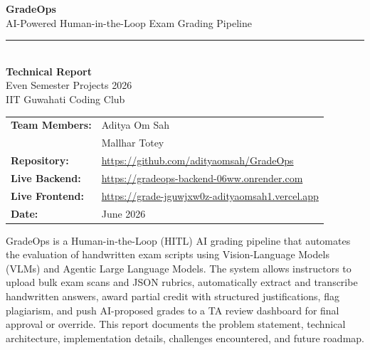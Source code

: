\documentclass[12pt,a4paper]{article}
\begin{document}

\begin{titlepage}
\centering
\vspace*{1cm}

{\Huge\bfseries\color{indigo} GradeOps}\\[0.4cm]
{\Large\color{slate} AI-Powered Human-in-the-Loop Exam Grading Pipeline}\\[0.8cm]

\noindent\rule{\textwidth}{0.5pt}\\[0.8cm]

{\large\bfseries Technical Report}\\[0.3cm]
{\normalsize Even Semester Projects 2026}\\[0.2cm]
{\normalsize IIT Guwahati Coding Club}\\[1.2cm]

\begin{tabular}{ll}
\textbf{Team Members:} & Aditya Om Sah \\
                        & Mallhar Totey \\[0.4cm]
\textbf{Repository:}    & \url{https://github.com/adityaomsah/GradeOps} \\[0.4cm]
\textbf{Live Backend:}  & \url{https://gradeops-backend-06ww.onrender.com} \\[0.2cm]
\textbf{Live Frontend:} & \url{https://grade-jguwjxw0z-adityaomsah1.vercel.app} \\[0.4cm]
\textbf{Date:}          & June 2026 \\
\end{tabular}

\vfill

\begin{infobox}[Abstract]
GradeOps is a Human-in-the-Loop (HITL) AI grading pipeline that automates the evaluation of handwritten exam scripts using Vision-Language Models (VLMs) and Agentic Large Language Models. The system allows instructors to upload bulk exam scans and JSON rubrics, automatically extract and transcribe handwritten answers, award partial credit with structured justifications, flag plagiarism, and push AI-proposed grades to a TA review dashboard for final approval or override. This report documents the problem statement, technical architecture, implementation details, challenges encountered, and future roadmap.
\end{infobox}

\end{titlepage}
\end{document}
